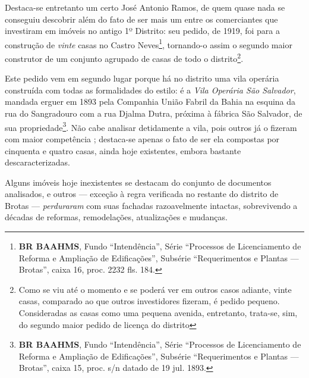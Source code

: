 Destaca-se entretanto um certo José Antonio Ramos, de quem quase nada se conseguiu descobrir além do fato de ser mais um entre os comerciantes que investiram em imóveis no antigo 1º Distrito: seu pedido, de 1919, foi para a construção de \textit{vinte} casas no Castro Neves\footnote{\textbf{BR BAAHMS}, Fundo ``Intendência'', Série ``Processos de Licenciamento de Reforma e Ampliação de Edificações'', Subsérie ``Requerimentos e Plantas --- Brotas'', caixa 16, proc. 2232 fls. 184.}, tornando-o assim o segundo maior construtor de um conjunto agrupado de casas de todo o distrito\footnote{Como se viu até o momento e se poderá ver em outros casos adiante, vinte casas, comparado ao que outros investidores fizeram, é pedido pequeno. Consideradas as casas como uma pequena avenida, entretanto, trata-se, sim, do segundo maior pedido de licença do distrito}. 

Este pedido vem em segundo lugar porque há no distrito uma vila operária construída com todas as formalidades do estilo: é a \textit{Vila Operária São Salvador}, mandada erguer em 1893 pela Companhia União Fabril da Bahia na esquina da rua do Sangradouro com a rua Djalma Dutra, próxima à fábrica São Salvador, de sua propriedade\footnote{\textbf{BR BAAHMS}, Fundo ``Intendência'', Série ``Processos de Licenciamento de Reforma e Ampliação de Edificações'', Subsérie ``Requerimentos e Plantas --- Brotas'', caixa 15, proc. s/n datado de 19 jul. 1893.}. Não cabe analisar detidamente a vila, pois outros já o fizeram com maior competência \cite{cardoso1990proleta, cardoso_vilas_1991}; destaca-se apenas o fato de ser ela compostas por cinquenta e quatro casas, ainda hoje existentes, embora bastante descaracterizadas.


Alguns imóveis hoje inexistentes se destacam do conjunto de documentos analisados, e outros --- exceção à regra verificada no restante do distrito de Brotas --- \textit{perduraram} com suas fachadas razoavelmente intactas, sobrevivendo a décadas de reformas, remodelações, atualizações e mudanças.

